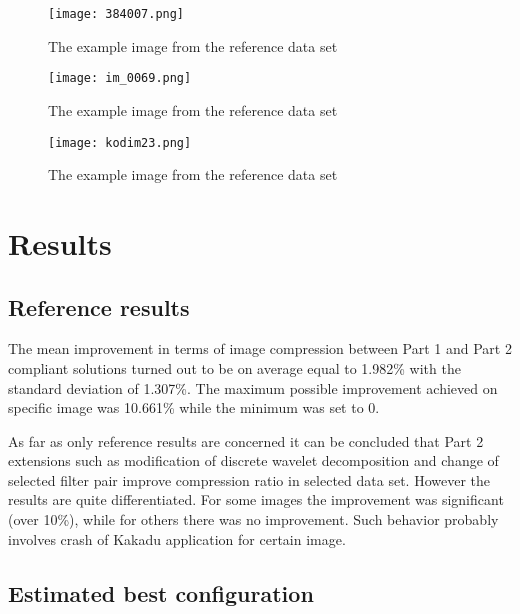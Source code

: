 \begin{figure}
    \centering
    \texttt{[image: 384007.png]}
    \caption{The example image from the reference data set \cite{ref_images}}
    \label{fig:example_1}
\end{figure}

\begin{figure}
    \centering
    \texttt{[image: im\_0069.png]}
    \caption{The example image from the reference data set \cite{ref_images}}
    \label{fig:example_2}
\end{figure}

\begin{figure}
    \centering
    \texttt{[image: kodim23.png]}
    \caption{The example image from the reference data set \cite{ref_images}}
    \label{fig:example_3}
\end{figure}


\section{Results}

\subsection{Reference results} \label{sec:ref_results}

The mean improvement in terms of image compression between Part 1 and Part 2 compliant solutions
turned out to be on average equal to 1.982\% with the standard deviation of 1.307\%. The maximum
possible improvement achieved on specific image was 10.661\% while the minimum was set to 0.

As far as only reference results are concerned it can be concluded that Part 2 extensions such as modification
of discrete wavelet decomposition and change of selected filter pair improve compression ratio
in selected data set. However the results are quite differentiated. For some images the improvement
was significant (over 10\%), while for others there was no improvement. Such behavior probably
involves crash of Kakadu application for certain image.


\subsection{Estimated best configuration} \label{sec:my_results}

